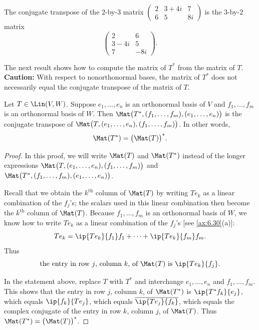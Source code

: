 \begin{example}\label{ax:7.8}
The conjugate transpose of the $2$-by-$3$ matrix
$\begin{pmatrix} 2 & 3+4i & 7\\ 6 & 5 & 8i \end{pmatrix}$
is the $3$-by-$2$ matrix
\[ \begin{pmatrix} 2 & 6\\ 3-4i & 5\\ 7 & -8i \end{pmatrix}. \]
\end{example}

%
%
The next result shows how to compute the matrix of $T^*$ from the matrix of
$T$. \textbf{Caution:} With respect to nonorthonormal bases, the matrix of $T^*$
does not necessarily equal the conjugate transpose of the matrix of $T$.

\begin{result}%
\label{ax:7.9}
Let $T\in\Lin(V,W)$. Suppose $e_1,\dots,e_n$ is an orthonormal basis of $V$ and
$f_1,\dots,f_m$ is an orthonormal basis of $W$. Then
$\Mat\bigl(T^*,(f_1,\dots,f_m),(e_1,\dots,e_n)\bigr)$ is the conjugate transpose
of $\Mat\bigl(T,(e_1,\dots,e_n),(f_1,\dots,f_m)\bigr)$. In other words,
\[ \Mat(T^*) = \bigl(\Mat(T)\bigr)^*. \]
\end{result}

\begin{proof}
In this proof, we will write $\Mat(T)$ and $\Mat(T^*)$ instead of the longer
expressions $\Mat\bigl(T,(e_1,\dots,e_n),(f_1,\dots,f_m)\bigr)$ and
$\Mat\bigl(T^*,(f_1,\dots,f_m),(e_1,\dots,e_n)\bigr)$.

Recall that we obtain the $k^{\text{th}}$ column of $\Mat(T)$ by writing $Te_k$
as a linear combination of the $f_j$'s; the scalars used in this linear
combination then become the $k^{\text{th}}$ column of $\Mat(T)$. Because
$f_1,\dots,f_m$ is an orthonormal basis of $W$, we know how to write $Te_k$ as a
linear combination of the $f_j$'s [see \ref{ax:6.30}(a)]:
\[ Te_k = \ip{Te_k}{f_1}f_1+\cdots+\ip{Te_k}{f_m}f_m. \]
Thus
\[ \text{the entry in row $j$, column $k$, of $\Mat(T)$ is $\ip{Te_k}{f_j}$.} \]

In the statement above, replace $T$ with $T^*$ and interchange $e_1,\allowbreak\dots,e_n$
and $f_1,\allowbreak\dots,f_m$. This shows that the entry in row $j$, column $k$, of
$\Mat(T^*)$ is $\ip{T^*f_k}{e_j}$, which equals $\ip{f_k}{Te_j}$, which equals
$\overline{\ip{Te_j}{f_k}}$, which equals the complex conjugate of the entry in
row $k$, column $j$, of $\Mat(T)$. Thus $\Mat(T^*)=\bigl(\Mat(T)\bigr)^*$.
\end{proof}

